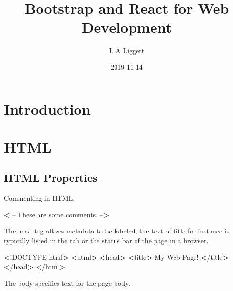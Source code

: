 \documentclass[]{book}
\title{Bootstrap and React for Web Development}
\author{L A Liggett}
\date{2019-11-14}
\newenvironment{Shaded}{\begin{snugshade}}{\end{snugshade}}
\newcommand{\ExtensionTok}[1]{#1}
\newcommand{\FunctionTok}[1]{\textcolor[rgb]{0.00,0.00,0.00}{#1}}
\newcommand{\NormalTok}[1]{#1}
\newcommand{\OperatorTok}[1]{\textcolor[rgb]{0.81,0.36,0.00}{\textbf{#1}}}
\begin{document}
\maketitle

{
\setcounter{tocdepth}{1}
\tableofcontents
}
\hypertarget{introduction}{%
\chapter{Introduction}\label{introduction}}

\hypertarget{html}{%
\chapter{HTML}\label{html}}

\hypertarget{html-properties}{%
\section{HTML Properties}\label{html-properties}}

Commenting in HTML.

\begin{Shaded}
\begin{Highlighting}[]
\OperatorTok{<}\NormalTok{!}\ExtensionTok{--}
\ExtensionTok{These}\NormalTok{ are some comments.}
\ExtensionTok{--}\OperatorTok{>}
\end{Highlighting}
\end{Shaded}

The head tag allows metadata to be labeled, the text of title for instance is typically listed in the tab or the status bar of the page in a browser.

\begin{Shaded}
\begin{Highlighting}[]
\OperatorTok{<}\NormalTok{!}\ExtensionTok{DOCTYPE}\NormalTok{ html}\OperatorTok{>}         
\OperatorTok{<}\ExtensionTok{html}\OperatorTok{>}                  
    \OperatorTok{<}\FunctionTok{head}\OperatorTok{>}              
        \OperatorTok{<}\ExtensionTok{title}\OperatorTok{>}         
            \ExtensionTok{My}\NormalTok{ Web Page!}
        \OperatorTok{<}\NormalTok{/}\ExtensionTok{title}\OperatorTok{>}        
    \OperatorTok{<}\NormalTok{/}\ExtensionTok{head}\OperatorTok{>}             
\OperatorTok{<}\NormalTok{/}\ExtensionTok{html}\OperatorTok{>}                 
\end{Highlighting}
\end{Shaded}

The body specifies text for the page body.
\end{document}
